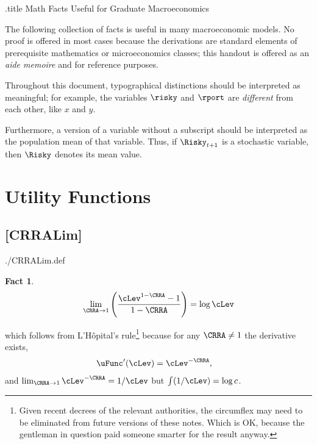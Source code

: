 \documentclass{handout}
\newtheorem{Fact}{Fact}
\begin{document}
\large

\handoutHeader


\begin{verbatimwrite}{\jobname.title}
Math Facts Useful for Graduate Macroeconomics
\end{verbatimwrite}

\handoutNameMake 

The following collection of facts is useful in many macroeconomic
models.  No proof is offered in most cases because the derivations
are standard elements of prerequisite mathematics or microeconomics classes;
this handout is offered as an {\it aide memoire} and for reference purposes.

Throughout this document, typographical distinctions should be interpreted as 
meaningful; for example, the variables $\risky$ and $\rport$ are {\it different} from 
each other, like $x$ and $y$.

Furthermore, a version of a variable without a subscript should be interpreted as 
the population mean of that variable.  Thus, if $\Risky_{t+1}$ is a stochastic
variable, then $\Risky$ denotes its mean value.


\section{{Utility Functions}}


\hypertarget{CRRALim}{}
\subsection{{[CRRALim]}}\label{CRRALim} 

\begin{verbatimwrite}{./CRRALim.def}
\providecommand{\CRRALim}{\href{https://www.econ2.jhu.edu/people/ccarroll/public/LectureNotes/MathFacts/MathFactsList\#CRRALim}{\ensuremath{\mathtt{[CRRALim]}}}}
\end{verbatimwrite}

\begin{Fact} \label{fact:CRRALim} 
\begin{equation}
\lim_{\CRRA \rightarrow 1} \left(\frac{\cLev^{1-\CRRA}-1}{1-\CRRA}\right) = \log \cLev
\end{equation}
\end{Fact}
\noindent which follows from L'H\^{o}pital's rule\footnote{Given recent decrees of the relevant authorities, the circumflex may need to be eliminated from future versions of these notes.  Which is OK, because the gentleman in question paid someone smarter for the result anyway.}  because for any $\CRRA \neq 1$ the derivative exists,
\begin{equation}\begin{gathered}\begin{aligned}
  \uFunc^{\prime}(\cLev) & =  \cLev^{-\CRRA},
\end{aligned}\end{gathered}\end{equation}
and $\lim_{\CRRA \rightarrow 1} \cLev^{-\CRRA} = 1/\cLev$ but $\int (1/\cLev) = \log c$.
\end{document}

